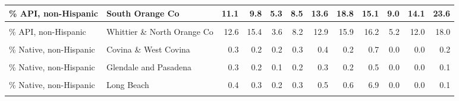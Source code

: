 \begin{table}[!h]
\begin{tabular}[t]{l|>{}l||r|r|r|r|r|r|r|r|r|r}
\hline
\% API, non-Hispanic & South Orange Co & 11.1 & 9.8 & 5.3 & 8.5 & 13.6 & 18.8 & 15.1 & 9.0 & 14.1 & 23.6\\
\hline
\cellcolor{gray!6}{\% API, non-Hispanic} & \cellcolor{gray!6}{West Los Angeles \& West Beach} & \cellcolor{gray!6}{9.9} & \cellcolor{gray!6}{7.9} & \cellcolor{gray!6}{4.9} & \cellcolor{gray!6}{7.5} & \cellcolor{gray!6}{11.7} & \cellcolor{gray!6}{13.1} & \cellcolor{gray!6}{9.5} & \cellcolor{gray!6}{6.5} & \cellcolor{gray!6}{9.8} & \cellcolor{gray!6}{17.6}\\
\hline
\% API, non-Hispanic & Whittier \& North Orange Co & 12.6 & 15.4 & 3.6 & 8.2 & 12.9 & 15.9 & 16.2 & 5.2 & 12.0 & 18.0\\
\hline
\cellcolor{gray!6}{\% Native, non-Hispanic} & \cellcolor{gray!6}{Anaheim} & \cellcolor{gray!6}{0.3} & \cellcolor{gray!6}{0.2} & \cellcolor{gray!6}{0.2} & \cellcolor{gray!6}{0.3} & \cellcolor{gray!6}{0.4} & \cellcolor{gray!6}{0.5} & \cellcolor{gray!6}{6.0} & \cellcolor{gray!6}{0.0} & \cellcolor{gray!6}{0.0} & \cellcolor{gray!6}{0.2}\\
\hline
\hline
\% Native, non-Hispanic & Covina \& West Covina & 0.3 & 0.2 & 0.2 & 0.3 & 0.4 & 0.2 & 0.7 & 0.0 & 0.0 & 0.2\\
\hline
\cellcolor{gray!6}{\% Native, non-Hispanic} & \cellcolor{gray!6}{East Los Angeles} & \cellcolor{gray!6}{0.2} & \cellcolor{gray!6}{0.2} & \cellcolor{gray!6}{0.1} & \cellcolor{gray!6}{0.2} & \cellcolor{gray!6}{0.3} & \cellcolor{gray!6}{0.2} & \cellcolor{gray!6}{0.6} & \cellcolor{gray!6}{0.0} & \cellcolor{gray!6}{0.0} & \cellcolor{gray!6}{0.2}\\
\hline
\% Native, non-Hispanic & Glendale and Pasadena & 0.3 & 0.2 & 0.1 & 0.2 & 0.3 & 0.2 & 0.5 & 0.0 & 0.0 & 0.1\\
\hline
\cellcolor{gray!6}{\% Native, non-Hispanic} & \cellcolor{gray!6}{Hollywood \& Wilshire} & \cellcolor{gray!6}{0.2} & \cellcolor{gray!6}{0.2} & \cellcolor{gray!6}{0.1} & \cellcolor{gray!6}{0.2} & \cellcolor{gray!6}{0.3} & \cellcolor{gray!6}{0.2} & \cellcolor{gray!6}{0.5} & \cellcolor{gray!6}{0.0} & \cellcolor{gray!6}{0.0} & \cellcolor{gray!6}{0.0}\\
\hline
\% Native, non-Hispanic & Long Beach & 0.4 & 0.3 & 0.2 & 0.3 & 0.5 & 0.6 & 6.9 & 0.0 & 0.0 & 0.1\\
\hline
\cellcolor{gray!6}{\% Native, non-Hispanic} & \cellcolor{gray!6}{Riverside, San Bernardino, \& Ontario} & \cellcolor{gray!6}{0.5} & \cellcolor{gray!6}{0.4} & \cellcolor{gray!6}{0.3} & \cellcolor{gray!6}{0.5} & \cellcolor{gray!6}{0.6} & \cellcolor{gray!6}{0.3} & \cellcolor{gray!6}{0.6} & \cellcolor{gray!6}{0.0} & \cellcolor{gray!6}{0.0} & \cellcolor{gray!6}{0.3}\\

\end{tabular}
\end{table}
